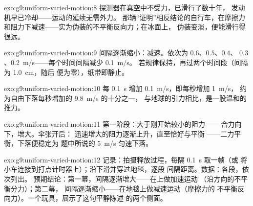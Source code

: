 \begin{solution}{exo:g9:uniform-varied-motion:8}
探测器在真空中不受力，已滑行了数十年，
发动机早已冷却——运动的延续无需外力。
那辆“证明”相反结论的自行车，在摩擦力
和阻力下减速——实为伪装的不平衡反向力；在冰面上，
伪装变淡，便能滑行得很远。
\end{solution}

\begin{solution}{exo:g9:uniform-varied-motion:9}
间隔逐渐缩小：减速。依次为 $0.6$、$0.5$、$0.4$、
$0.3$、\qty{0.2}{m/s}——每个时间间隔减少 \qty{0.1}{m/s}。
若规律保持，再过两个时间段（间隔为 \qty{1.0}{cm}，随后
便为零），纸带即静止。
\end{solution}

\begin{solution}{exo:g9:uniform-varied-motion:10}
每 \qty{0.1}{s} 增加 \qty{0.1}{m/s}，即每秒增加 \qty{1}{m/s}，
约为自由下落每秒增加的 \qty{9.8}{m/s} 的十分之一，
与地球的引力相比，是一股温和的推力。
\end{solution}

\begin{solution}{exo:g9:uniform-varied-motion:11}
第一阶段：大于刚开始较小的阻力——
合力向下，增大。伞张开后：
迅速增大的阻力逐渐上升，直至恰好与平衡
——二力平衡，下落便稳定为
题中所说的 \qty{5}{m/s} 匀速下落。
\end{solution}

\begin{solution}{exo:g9:uniform-varied-motion:12}
记录：拍摄释放过程，每隔 \qty{0.1}{s} 取一帧（或
将小车连接到打点计时器上）；沿下滑并穿过地毯，逐段
间隔距离。数据：各段，依次列出。
预期结论：第一幕，间隔逐渐增大——在上做加速运动
（沿方向的不平衡分力）；第二幕，
间隔逐渐缩小——在地毯上做减速运动（摩擦力的
不平衡反向力）。一个玩具，展示了这句平静陈述
的两个侧面。
\end{solution}

